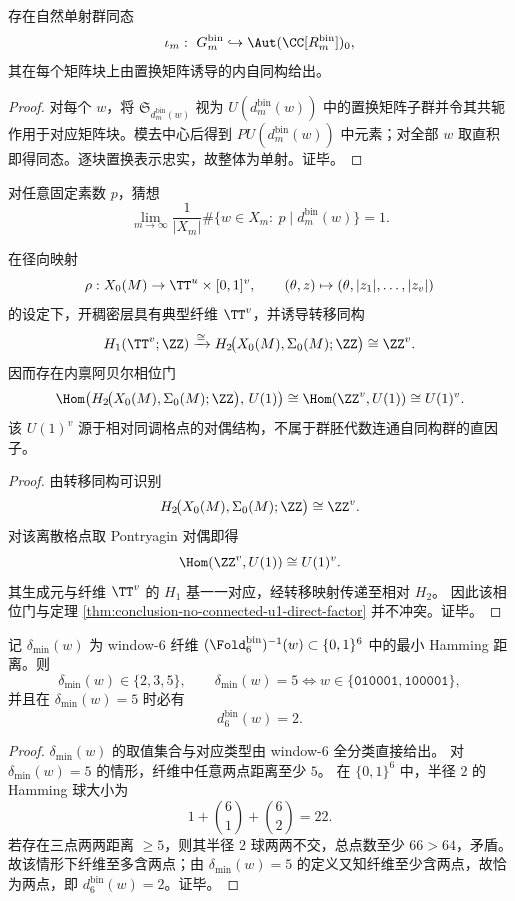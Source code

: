 \begin{proposition}[离散到连续的自然嵌入]\label{prop:conclusion-discrete-into-connected}
存在自然单射群同态
\[
\iota_m:\ G_m^{\mathrm{bin}}\hookrightarrow \Aut(\CC[R_m^{\mathrm{bin}}])_0,
\]
其在每个矩阵块上由置换矩阵诱导的内自同构给出。
\end{proposition}
\begin{proof}
对每个 \(w\)，将 \(\mathfrak S_{d_m^{\mathrm{bin}}(w)}\) 视为 \(U(d_m^{\mathrm{bin}}(w))\) 中的置换矩阵子群并令其共轭作用于对应矩阵块。模去中心后得到 \(PU(d_m^{\mathrm{bin}}(w))\) 中元素；对全部 \(w\) 取直积即得同态。逐块置换表示忠实，故整体为单射。证毕。
\end{proof}

\begin{conjecture}[典型纤维多重度的素数整除]\label{conj:conclusion-typical-fiber-prime-divisibility}
对任意固定素数 \(p\)，猜想
\[
\lim_{m\to\infty}\frac1{|X_m|}\#\{w\in X_m:\ p\mid d_m^{\mathrm{bin}}(w)\}=1.
\]
\end{conjecture}

\begin{theorem}\label{thm:conclusion-u1-from-relative-homology-dual}
在径向映射
\[
\rho:X_0(M)\to \TT^u\times[0,1]^v,\qquad
(\theta,z)\mapsto(\theta,|z_1|,\dots,|z_v|)
\]
的设定下，开稠密层具有典型纤维 \(\TT^v\)，并诱导转移同构
\[
H_1(\TT^v;\ZZ)
\xrightarrow{\cong}
H_2\!\bigl(X_0(M),\Sigma_0(M);\ZZ\bigr)
\cong
\ZZ^v.
\]
因而存在内禀阿贝尔相位门
\[
\Hom\!\left(H_2\!\bigl(X_0(M),\Sigma_0(M);\ZZ\bigr),\,U(1)\right)
\cong
\Hom(\ZZ^v,U(1))
\cong
U(1)^v.
\]
该 \(U(1)^v\) 源于相对同调格点的对偶结构，不属于群胚代数连通自同构群的直因子。
\end{theorem}
\begin{proof}
由转移同构可识别
\[
H_2\!\bigl(X_0(M),\Sigma_0(M);\ZZ\bigr)\cong \ZZ^v.
\]
对该离散格点取 Pontryagin 对偶即得
\[
\Hom(\ZZ^v,U(1))\cong U(1)^v.
\]
其生成元与纤维 \(\TT^v\) 的 \(H_1\) 基一一对应，经转移映射传递至相对 \(H_2\)。
因此该相位门与定理 \ref{thm:conclusion-no-connected-u1-direct-factor} 并不冲突。证毕。
\end{proof}

\begin{proposition}[纤维内最大分离度强制双态]\label{prop:conclusion-window6-delta5-implies-twofold}
记 \(\delta_{\min}(w)\) 为 window-\(6\) 纤维
\(
(\Fold_6^{\mathrm{bin}})^{-1}(w)\subset\{0,1\}^6
\)
中的最小 Hamming 距离。则
\[
\delta_{\min}(w)\in\{2,3,5\},\qquad
\delta_{\min}(w)=5
\Longleftrightarrow
w\in\{\texttt{010001},\texttt{100001}\},
\]
并且在 \(\delta_{\min}(w)=5\) 时必有
\[
d_6^{\mathrm{bin}}(w)=2.
\]
\end{proposition}
\begin{proof}
\(\delta_{\min}(w)\) 的取值集合与对应类型由 window-\(6\) 全分类直接给出。
对 \(\delta_{\min}(w)=5\) 的情形，纤维中任意两点距离至少 \(5\)。
在 \(\{0,1\}^6\) 中，半径 \(2\) 的 Hamming 球大小为
\[
1+\binom61+\binom62=22.
\]
若存在三点两两距离 \(\ge 5\)，则其半径 \(2\) 球两两不交，总点数至少 \(66>64\)，矛盾。
故该情形下纤维至多含两点；由 \(\delta_{\min}(w)=5\) 的定义又知纤维至少含两点，故恰为两点，即 \(d_6^{\mathrm{bin}}(w)=2\)。证毕。
\end{proof}

